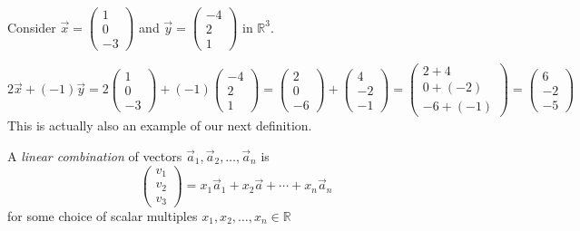 \begin{example}
Consider  $\vec{x}=\begin{pmatrix}1\\ 0  \\ -3\end{pmatrix}$ and 
$\vec{y}=\begin{pmatrix}-4\\ 2 \\ 1\end{pmatrix}$ in $\mathbb{R}^3$.

\[
2\vec{x}+(-1)\vec{y}=
2\begin{pmatrix}1\\ 0  \\ -3\end{pmatrix}+
(-1)\begin{pmatrix}-4\\ 2 \\ 1\end{pmatrix}=
\begin{pmatrix}2\\ 0  \\ -6\end{pmatrix}+
\begin{pmatrix}4\\ -2 \\ -1\end{pmatrix}=
\begin{pmatrix}2+4\\ 0+(-2)  \\ -6+(-1)\end{pmatrix}=
\begin{pmatrix}6\\ -2  \\ -5\end{pmatrix}
\]
This is actually also an example of our next definition.
\end{example}
\begin{definition}
A \emph{linear combination} of vectors $\vec{a}_1, \vec{a}_2, \ldots, \vec{a}_n$ is 
\[
\begin{pmatrix}v_1 \\ v_2 \\ v_3\end{pmatrix}=x_1\vec{a}_1+x_2\vec{a}+\cdots+x_n\vec{a}_n
\]  
for some choice of scalar multiples $x_1,x_2, \ldots, x_n \in \mathbb{R}$
\end{definition}


